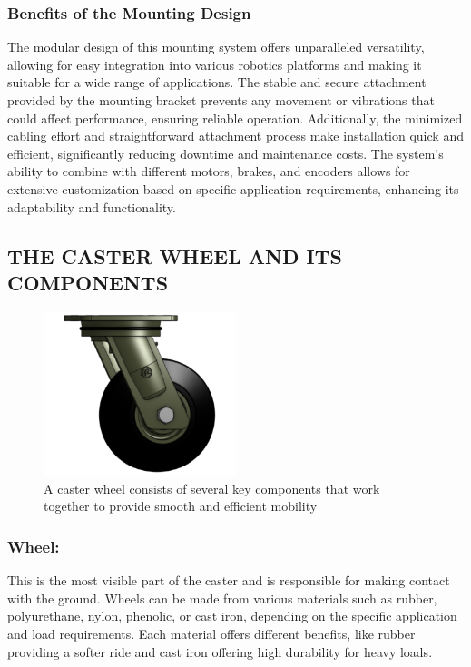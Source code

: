 \documentclass[../../main]{subfiles}
\begin{document}
\subsubsection{Benefits of the Mounting Design}
The modular design of this mounting system offers unparalleled versatility, allowing for easy integration into various robotics platforms and making it suitable for a wide range of applications. The stable and secure attachment provided by the mounting bracket prevents any movement or vibrations that could affect performance, ensuring reliable operation. Additionally, the minimized cabling effort and straightforward attachment process make installation quick and efficient, significantly reducing downtime and maintenance costs. The system's ability to combine with different motors, brakes, and encoders allows for extensive customization based on specific application requirements, enhancing its adaptability and functionality.

\subsection{THE CASTER WHEEL AND ITS COMPONENTS}

\begin{figure}[h!]
  \centering
  \includegraphics[width=0.5\textwidth]{img/caster.png}
  \caption[Key Components of a Caster Wheel]{A caster wheel consists of several key components that work together to provide smooth and efficient mobility}

  \end{figure}

\subsubsection{Wheel:}
This is the most visible part of the caster and is responsible for making contact with the ground. Wheels can be made from various materials such as rubber, polyurethane, nylon, phenolic, or cast iron, depending on the specific application and load requirements. Each material offers different benefits, like rubber providing a softer ride and cast iron offering high durability for heavy loads.
\end{document}
